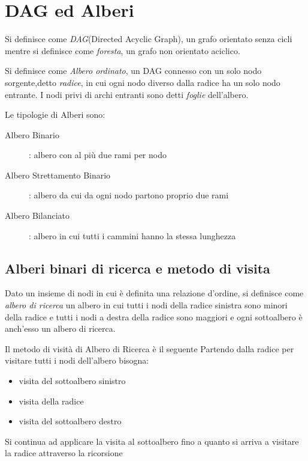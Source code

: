 \section{DAG ed Alberi}
Si definisce come \emph{DAG}(Directed Acyclic Graph), un grafo orientato senza cicli
mentre si definisce come \emph{foresta}, un grafo non orientato aciclico.

Si definisce come \emph{Albero ordinato}, un DAG connesso con un solo nodo sorgente,detto \emph{radice},
in cui ogni nodo diverso dalla radice ha un solo nodo entrante.\newline
I nodi privi di archi entranti sono detti \emph{foglie} dell'albero.


Le tipologie di Alberi sono:
\begin{description}
    \item[Albero Binario]: albero con al più due rami per nodo
    \item[Albero Strettamento Binario]: albero da cui da ogni nodo partono proprio due rami
    \item[Albero Bilanciato]: albero in cui tutti i cammini hanno la stessa lunghezza
\end{description}



\subsection{Alberi binari di ricerca e metodo di visita}
Dato un insieme di nodi in cui è definita una relazione d'ordine, si definisce come
\emph{albero di ricerca} un albero in cui tutti i nodi della radice sinistra sono
minori della radice e tutti i nodi a destra della radice sono maggiori e ogni sottoalbero
è anch'esso un albero di ricerca.


Il metodo di visità di Albero di Ricerca è il seguente
Partendo dalla radice per visitare tutti i nodi dell'albero bisogna:
\begin{itemize}
    \item visita del sottoalbero sinistro
    \item visita della radice
    \item visita del sottoalbero destro
\end{itemize}
Si continua ad applicare la visita al sottoalbero fino a quanto si arriva a visitare la radice
attraverso la ricorsione

